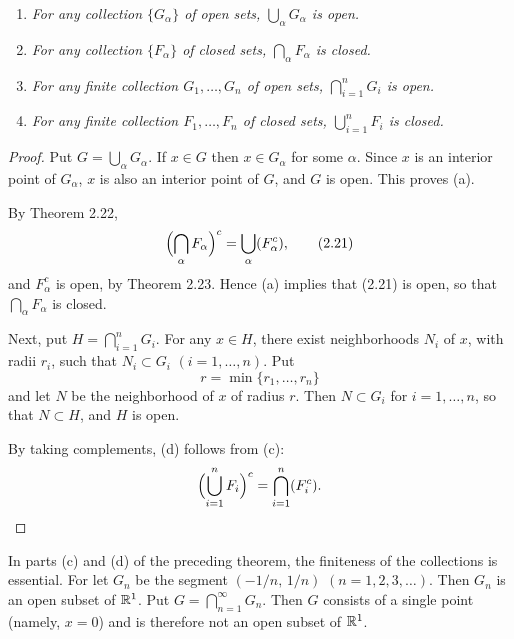 \begin{enumerate}[label=(\alph*), leftmargin=2.2em, itemsep=1pt, topsep=3pt]
  \item \emph{For any collection $\{G_\alpha\}$ of open sets,
        $\bigcup_\alpha G_\alpha$ is open.}
  \item \emph{For any collection $\{F_\alpha\}$ of closed sets,
        $\bigcap_\alpha F_\alpha$ is closed.}
  \item \emph{For any finite collection $G_1,\dots,G_n$ of open sets,
        $\bigcap_{i=1}^n G_i$ is open.}
  \item \emph{For any finite collection $F_1,\dots,F_n$ of closed sets,
        $\bigcup_{i=1}^n F_i$ is closed.}
\end{enumerate}

\begin{proof}
Put $G = \bigcup_\alpha G_\alpha$. If $x \in G$ then $x \in G_\alpha$ for some
$\alpha$. Since $x$ is an interior point of $G_\alpha$, $x$ is also an interior
point of $G$, and $G$ is open. This proves (a).

By Theorem 2.22,
\begin{equation}
  \Bigl(\bigcap_\alpha F_\alpha\Bigr)^c = \bigcup_\alpha (F_\alpha^c),
  \tag{2.21}
\end{equation}
and $F_\alpha^c$ is open, by Theorem 2.23. Hence (a) implies that (2.21) is
open, so that $\bigcap_\alpha F_\alpha$ is closed.

Next, put $H = \bigcap_{i=1}^n G_i$. For any $x \in H$, there exist
neighborhoods $N_i$ of $x$, with radii $r_i$, such that $N_i \subset G_i$
$(i = 1,\dots,n)$. Put
\[ r = \min\{r_1,\dots,r_n\} \]
and let $N$ be the neighborhood of $x$ of radius $r$. Then $N \subset G_i$ for
$i = 1,\dots,n$, so that $N \subset H$, and $H$ is open.

By taking complements, (d) follows from (c):
\[ \Bigl(\bigcup_{i=1}^n F_i\Bigr)^c = \bigcap_{i=1}^n (F_i^c). \qedhere \]
\end{proof}

In parts (c) and (d) of the preceding theorem, the finiteness of the
collections is essential. For let $G_n$ be the segment $(-1/n,\,1/n)$
$(n = 1,2,3,\dots)$. Then $G_n$ is an open subset of $\mathbb{R}^1$. Put
$G = \bigcap_{n=1}^\infty G_n$. Then $G$ consists of a single point (namely,
$x = 0$) and is therefore not an open subset of $\mathbb{R}^1$.

